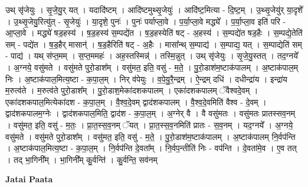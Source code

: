 \documentclass[17pt]{extarticle}
\begin{document}
उथ् सृ॑जेयुः । सृ॒जे॒यु॒र् यत् । यदादि॑ष्टम् । आदि॑ष्टमुथ्सृ॒जेयुः॑ । आदि॑ष्ट॒मित्या - दि॒ष्ट॒म् । 
उ॒थ्सृ॒जेयु॑र् या॒दृशे᳚ । उ॒थ्सृ॒जेयु॒रित्यु॑त् - सृ॒जेयुः॑ । या॒दृशे॒ पुनः॑ । पुनः॑ पर्याप्ला॒वे । प॒र्या॒प्ला॒वे मद्ध्ये᳚ । प॒र्या॒प्ला॒व इति॑ परि - आ॒प्ला॒वे । मद्ध्ये॑ षड॒हस्य॑ । ष॒ड॒हस्य॑ स॒म्पद्ये॑त । ष॒ड॒हस्येति॑ षट् - अ॒हस्य॑ । स॒म्पद्ये॑त षड॒हैः । स॒म्पद्ये॒तेति॑ सम् - पद्ये॑त । ष॒ड॒हैर् मासान्॑ । ष॒ड॒हैरिति॑ षट् - अ॒हैः । मासा᳚न्थ् स॒म्पाद्य॑ । स॒म्पाद्य॒ यत् । स॒म्पाद्येति॑ सम् - पाद्य॑ । यथ् स॑प्त॒मम् । स॒प्त॒ममहः॑ । अह॒स्तस्मिन्न्॑ । तस्मि॒न्नुत् । उथ् सृ॑जेयुः । सृ॒जे॒यु॒स्तत् । तद॒ग्नये᳚ । अ॒ग्नये॒ वसु॑मते । वसु॑मते पुरो॒डाश᳚म् । वसु॑मत॒ इति॒ वसु॑ - म॒ते॒ । पु॒रो॒डाश॑म॒ष्टाक॑पालम् । अ॒ष्टाक॑पाल॒म् निः । अ॒ष्टाक॑पाल॒मित्य॒ष्टा - क॒पा॒ल॒म् । निर् व॑पेयुः । व॒पे॒यु॒रै॒न्द्रम् । ऐ॒न्द्रम् दधि॑ । दधीन्द्रा॑य । इन्द्रा॑य म॒रुत्व॑ते । म॒रुत्व॑ते पुरो॒डाश᳚म् । पु॒रो॒डाश॒मेका॑दशकपालम् । एका॑दशकपालम् ॅवैश्वदे॒वम् । एका॑दशकपाल॒मित्येका॑दश - क॒पा॒ल॒म् । वै॒श्व॒दे॒वम् द्वाद॑शकपालम् । वै॒श्व॒दे॒वमिति॑ वैश्व - दे॒वम् । द्वाद॑शकपालम॒ग्नेः । द्वाद॑शकपाल॒मिति॒ द्वाद॑श - क॒पा॒ल॒म् । अ॒ग्नेर् वै । वै वसु॑मतः । वसु॑मतः प्रातस्सव॒नम् । वसु॑मत॒ इति॒ वसु॑ - म॒तः॒ । प्रा॒त॒स्स॒व॒नम् ॅयत् । प्रा॒त॒स्स॒व॒नमिति॑ प्रातः - स॒व॒नम् । यद॒ग्नये᳚ । अ॒ग्नये॒ वसु॑मते । वसु॑मते पुरो॒डाश᳚म् । वसु॑मत॒ इति॒ वसु॑ - म॒ते॒ । पु॒रो॒डाश॑म॒ष्टाक॑पालम् । अ॒ष्टाक॑पालम् नि॒र्वप॑न्ति । अ॒ष्टाक॑पाल॒मित्य॒ष्टा - क॒पा॒ल॒म् । नि॒र्वप॑न्ति दे॒वता᳚म् । नि॒र्वप॒न्तीति॑ निः - वप॑न्ति । दे॒वता॑मे॒व । ए॒व तत् । तद् भा॒गिनी᳚म् । भा॒गिनी᳚म् कु॒र्वन्ति॑ । कु॒र्वन्ति॒ सव॑नम् \newline

\textbf{Jatai Paata} \newline
\end{document}
